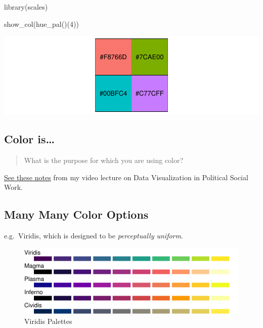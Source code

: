\documentclass[
]{article}
\newenvironment{Shaded}{}{}
\newcommand{\DecValTok}[1]{#1}
\newcommand{\FunctionTok}[1]{#1}
\newcommand{\NormalTok}[1]{#1}
\begin{document}
\begin{Shaded}
\begin{Highlighting}[]
\FunctionTok{library}\NormalTok{(scales)}

\FunctionTok{show\_col}\NormalTok{(}\FunctionTok{hue\_pal}\NormalTok{()(}\DecValTok{4}\NormalTok{))}
\end{Highlighting}
\end{Shaded}

\includegraphics{design_files/figure-latex/unnamed-chunk-8-1.pdf}

\hypertarget{color-is}{%
\subsection{Color is\ldots{}}\label{color-is}}

\begin{quote}
What is the purpose for which you are using color?
\end{quote}

\href{../political-social-work/index.html\#/color-scroll-down}{See these
notes} from my video lecture on Data Visualization in Political Social
Work.

\hypertarget{many-many-color-options}{%
\subsection{Many Many Color Options}\label{many-many-color-options}}

e.g.~Viridis, which is designed to be \emph{perceptually uniform}.

\begin{figure}
\centering
\includegraphics{design_files/figure-latex/unnamed-chunk-9-1.pdf}
\caption{Viridis Palettes}
\end{figure}
\end{document}
